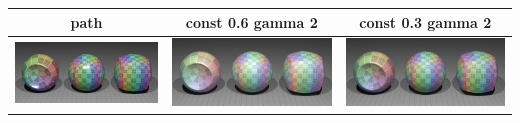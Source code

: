 \documentclass[11pt]{article}
\begin{document}
\begin{table}[ht]
  \centering
  \begin{tabular}{ | c | c | c |}
    \hline
    path & const 0.6 gamma 2 & const 0.3 gamma 2 \\ \hline
    \begin{minipage}{.3\textwidth}
      \includegraphics[scale=0.1]{img/obj/simple_pl/simple_pl.jpg}
    \end{minipage}
    &
    \begin{minipage}{.3\textwidth}
      \includegraphics[scale=0.1]{img/obj/simple_pl/simple_pl_disney.jpg}
    \end{minipage}
    & 
    \begin{minipage}{.3\textwidth}
      \includegraphics[scale=0.1]{img/obj/simple_pl/simple_pl_disney_dc03.jpg}
    \end{minipage}
    \\ \hline
  \end{tabular}
\end{table}
\end{document}
